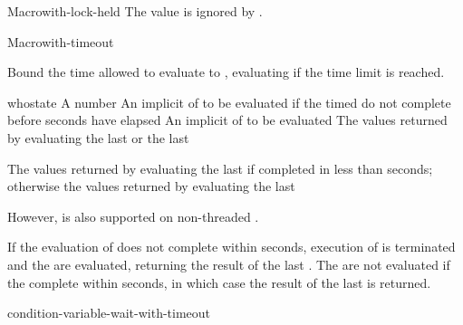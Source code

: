\documentclass[10pt,twoside,english,pdftex]{article}
\begin{document}
\begin{functiondoc}{Macro}{with-lock-held}{%
    }
\fnnote The  value is ignored by
.

\end{functiondoc}


\begin{functiondoc}{Macro}{with-timeout}{%
    }
\fnsyntax

\fnpurpose Bound the time allowed to evaluate  to
, evaluating  if the time
limit is reached.

\fnpackage {}

\fnmodule {}

\fnargs
\begin{args}{whostate}
\arg[seconds] A number
 An implicit  of  to be
evaluated if the timed  do not complete before  seconds have elapsed
\arg[forms] An implicit  of  to be evaluated
\arg[results] The values returned by evaluating the last  or the
last 
\end{args}

\fnreturns The values returned by evaluating the last  if
completed in less than  seconds; otherwise the values
returned by evaluating the last 

\fnerrors \nothreads{} However,  is also
supported on non-threaded .

\fndescription If the evaluation of  does not complete
within  seconds, execution of  is
terminated and the  are evaluated, returning the
result of the last . The 
are not evaluated if the  complete within
 seconds, in which case the result of the last
 is returned.

\begin{alsos}{condition-variable-wait-with-timeout}
\end{alsos}


\end{functiondoc}
\end{document}
